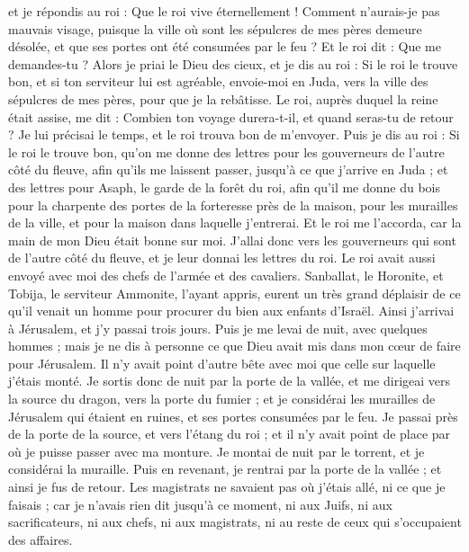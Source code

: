 \begin{multicols}{2}
et je répondis au roi : Que le roi vive éternellement ! Comment n'aurais-je pas mauvais visage, puisque la ville où sont les sépulcres de mes pères demeure désolée, et que ses portes ont été consumées par le feu ?
Et le roi dit : Que me demandes-tu ? Alors je priai le Dieu des cieux,
et je dis au roi : Si le roi le trouve bon, et si ton serviteur lui est agréable, envoie-moi en Juda, vers la ville des sépulcres de mes pères, pour que je la rebâtisse.
Le roi, auprès duquel la reine était assise, me dit : Combien ton voyage durera-t-il, et quand seras-tu de retour ? Je lui précisai le temps, et le roi trouva bon de m'envoyer.
Puis je dis au roi : Si le roi le trouve bon, qu'on me donne des lettres pour les gouverneurs de l'autre côté du fleuve, afin qu'ils me laissent passer, jusqu'à ce que j'arrive en Juda ;
et des lettres pour Asaph, le garde de la forêt du roi, afin qu'il me donne du bois pour la charpente des portes de la forteresse près de la maison, pour les murailles de la ville, et pour la maison dans laquelle j'entrerai. Et le roi me l'accorda, car la main de mon Dieu était bonne sur moi.
J’allai donc vers les gouverneurs qui sont de l’autre côté du fleuve, et je leur donnai les lettres du roi. Le roi avait aussi envoyé avec moi des chefs de l’armée et des cavaliers.
Sanballat, le Horonite, et Tobija, le serviteur Ammonite, l’ayant appris, eurent un très grand déplaisir de ce qu'il venait un homme pour procurer du bien aux enfants d'Israël.
Ainsi j'arrivai à Jérusalem, et j'y passai trois jours.
Puis je me levai de nuit, avec quelques hommes ; mais je ne dis à personne ce que Dieu avait mis dans mon cœur de faire pour Jérusalem. Il n'y avait point d'autre bête avec moi que celle sur laquelle j'étais monté.
Je sortis donc de nuit par la porte de la vallée, et me dirigeai vers la source du dragon, vers la porte du fumier ; et je considérai les murailles de Jérusalem qui étaient en ruines, et ses portes consumées par le feu.
Je passai près de la porte de la source, et vers l'étang du roi ; et il n'y avait point de place par où je puisse passer avec ma monture.
Je montai de nuit par le torrent, et je considérai la muraille. Puis en revenant, je rentrai par la porte de la vallée ; et ainsi je fus de retour.
Les magistrats ne savaient pas où j'étais allé, ni ce que je faisais ; car je n'avais rien dit jusqu’à ce moment, ni aux Juifs, ni aux sacrificateurs, ni aux chefs, ni aux magistrats, ni au reste de ceux qui s'occupaient des affaires.

\end{multicols}
